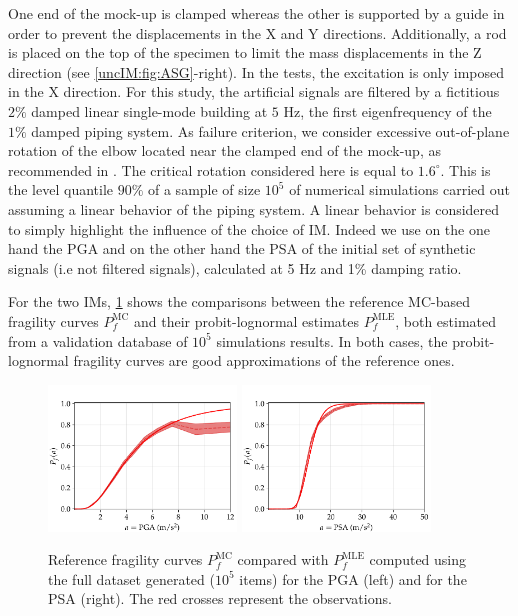 One end of the mock-up is clamped whereas the other is supported by a guide in order to prevent the displacements in the X and Y directions. Additionally, a rod is  placed on the top of the specimen to limit the mass displacements in the Z direction (see \cref{uncIM:fig:ASG}-right). In the tests, the excitation is only imposed in the X direction. For this study, the artificial signals are filtered by a fictitious $2\%$ damped linear single-mode building at $5$ Hz, the first eigenfrequency of the $1\%$ damped piping system. As failure criterion, we consider excessive out-of-plane rotation of the elbow located near the clamped end of the mock-up, as recommended in \cite{touboul_enhanced_2006}. The critical rotation considered here is equal to $1.6^{\circ}$. This is the level quantile $90\%$ of a sample of size $10^5$ of numerical simulations carried out assuming a linear behavior of the piping system. A linear behavior is considered to simply highlight the influence of the choice of IM. Indeed we use on the one hand the PGA and on the other hand the PSA of the initial set of synthetic signals (i.e not filtered signals), calculated at 5 Hz and 1\% damping ratio. 

For the two IMs, \cref{uncIM:fig:ref-ASG} shows the comparisons between the reference MC-based fragility curves $P_f^{\mathrm{MC}}$ and their probit-lognormal estimates $P_f^{\mathrm{MLE}}$, both estimated from a validation database of $10^5$ simulations results. In both cases, the probit-lognormal fragility curves are good approximations of the reference ones.

\begin{figure}[!h]
    \centering
     {\includegraphics[width=5cm]{figures/uncIM/ref_ASG_PGA.pdf}}
     {\includegraphics[width=5cm]{figures/uncIM/ref_ASG_PSA.pdf}}
    \caption{Reference fragility curves $P_f^{\mathrm{MC}}$ compared with $P_f^{\mathrm{MLE}}$ computed using the full dataset generated ($10^5$ items) for the PGA (left) and for the PSA (right). The red crosses represent the observations.}
     \label{uncIM:fig:ref-ASG}
\end{figure}




